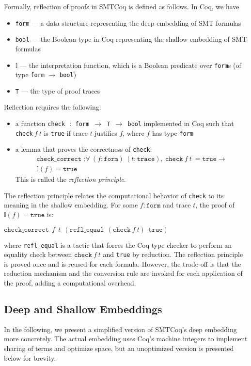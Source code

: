 \documentclass{article}
\begin{document}
	Formally, reflection of proofs 
	in SMTCoq is defined as follows. 
	In Coq, we have 
	\begin{itemize}
		\item \texttt{form} --- a data 
		structure representing the deep 
		embedding of SMT formulas
		\item \texttt{bool} --- the 
		Boolean type in Coq 
		representing the shallow 
		embedding of SMT formulas
		\item $\mathbb{I}$ --- the 
		interpretation function, which 
		is a Boolean predicate over 
		\texttt{form}s (of type 
		\texttt{form} $\to$ 
		\texttt{bool})
		\item \texttt{T} --- the type of 
		proof traces
	\end{itemize}
	Reflection requires the following:
	\begin{itemize}
		\item a function 
		\texttt{check : form $\to$ T $\to$ 
		bool} implemented in Coq such that 
		\texttt{check}$\ f\ t$ is 
		\texttt{true} if trace $t$
		justifies $f$,
		where $f$ has type 
		\texttt{form}
		\item a lemma that proves the 
		correctness of \texttt{check}:
		\begin{align*}
			\texttt{check\_correct :} 
			\forall\ (f : \texttt{form})\ 
			(t : \texttt{trace}),\ 
			\texttt{check}\ f\ t\ = 
			\texttt{true} \to \\
			\mathbb{I}(f) = 
			\texttt{true}
		\end{align*}
		This is called the 
		\textit{reflection principle}.
	\end{itemize}
	The reflection principle relates 
	the computational behavior of 
	\texttt{check} to its meaning
	in the shallow embedding. For some 
	$f : \texttt{form}$ and trace $t$, 
	the proof of $\mathbb{I}(f) = 
	\texttt{true}$ is:
	\begin{center}
		$\texttt{check\_correct}\ \ 
		f\ \ t\ \ (\texttt{refl\_equal}\ \ 
		(\texttt{check}\ f\ t)\ \ 
		\texttt{true})$
	\end{center}
	where \texttt{refl\_equal} is a tactic
	that forces the Coq type checker to 
	perform an equality check between 
	$\texttt{check}\ f\ t$ and \texttt{true}
	by reduction. The reflection principle 
	is proved once and is reused for 
	each formula. However, the trade-off is 
	that the reduction mechanism and the 
	conversion rule are invoked for each 
	application of the proof, adding a 
	computational overhead. 
	
	\subsection{Deep and Shallow Embeddings}
	In the following, we present 
	a simplified version of SMTCoq's 
	deep embedding more concretely. 
	The actual embedding uses Coq's 
	machine integers to implement 
	sharing of terms and optimize 
	space, but an unoptimized version 
	is presented below for brevity. 
	
\end{document}
